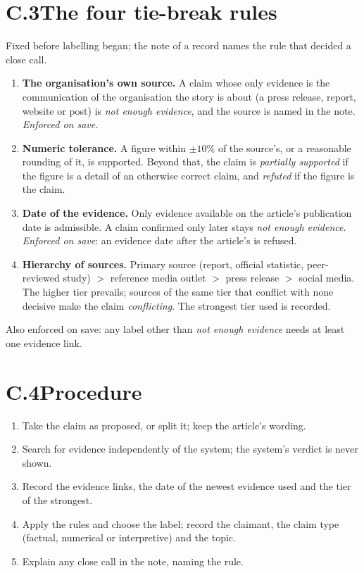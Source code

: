 \section*{C.3\quad The four tie-break rules}

Fixed before labelling began; the note of a record names the rule that
decided a close call.

\begin{enumerate}[label=\textbf{Rule \arabic*.}, leftmargin=*]
    \item \textbf{The organisation's own source.} A claim whose only
    evidence is the communication of the organisation the story is about
    (a press release, report, website or post) is \emph{not enough
    evidence}, and the source is named in the note. \emph{Enforced on
    save.}
    \item \textbf{Numeric tolerance.} A figure within $\pm10\%$ of the
    source's, or a reasonable rounding of it, is supported. Beyond that,
    the claim is \emph{partially supported} if the figure is a detail of
    an otherwise correct claim, and \emph{refuted} if the figure is the
    claim.
    \item \textbf{Date of the evidence.} Only evidence available on the
    article's publication date is admissible. A claim confirmed only
    later stays \emph{not enough evidence}. \emph{Enforced on save}: an
    evidence date after the article's is refused.
    \item \textbf{Hierarchy of sources.} Primary source (report,
    official statistic, peer-reviewed study) $>$ reference media outlet
    $>$ press release $>$ social media. The higher tier prevails; sources
    of the same tier that conflict with none decisive make the claim
    \emph{conflicting}. The strongest tier used is recorded.
\end{enumerate}

Also enforced on save: any label other than \emph{not enough evidence}
needs at least one evidence link.

\section*{C.4\quad Procedure}

\begin{enumerate}
    \item Take the claim as proposed, or split it; keep the article's
    wording.
    \item Search for evidence independently of the system; the system's
    verdict is never shown.
    \item Record the evidence links, the date of the newest evidence used
    and the tier of the strongest.
    \item Apply the rules and choose the label; record the claimant, the
    claim type (factual, numerical or interpretive) and the topic.
    \item Explain any close call in the note, naming the rule.
\end{enumerate}


